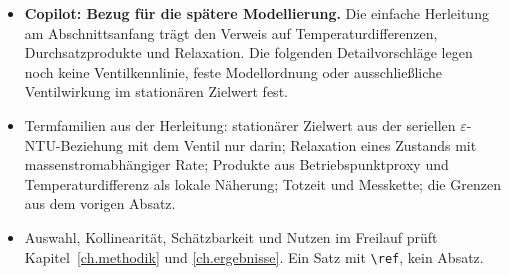 \begin{itemize}
  \item \textbf{Copilot: Bezug für die spätere Modellierung.}
    Die einfache Herleitung am Abschnittsanfang trägt den Verweis
    auf Temperaturdifferenzen, Durchsatzprodukte und Relaxation.
    Die folgenden Detailvorschläge legen noch keine Ventilkennlinie,
    feste Modellordnung oder ausschließliche Ventilwirkung im
    stationären Zielwert fest.
\end{itemize}
\begin{itemize}
  \item Termfamilien aus der Herleitung: stationärer Zielwert aus der seriellen
    $\varepsilon$-NTU-Beziehung mit dem Ventil nur darin; Relaxation eines
    Zustands mit massenstromabhängiger Rate; Produkte aus Betriebspunktproxy und
    Temperaturdifferenz als lokale Näherung; Totzeit und Messkette; die Grenzen
    aus dem vorigen Absatz.
  \item Auswahl, Kollinearität, Schätzbarkeit und Nutzen im Freilauf prüft
    Kapitel~\ref{ch.methodik} und \ref{ch.ergebnisse}. Ein Satz mit
    \verb|\ref|, kein Absatz.
\end{itemize}







